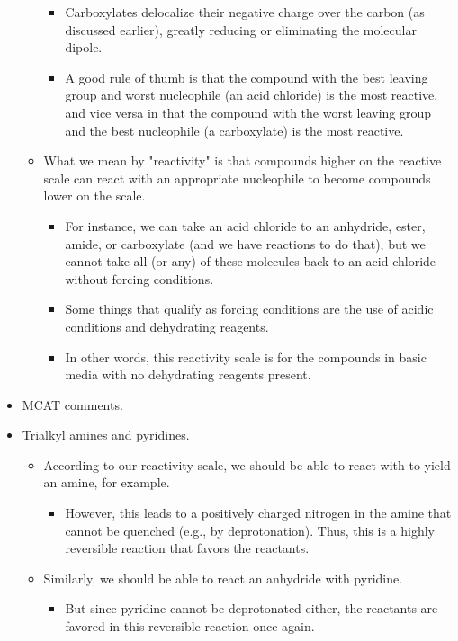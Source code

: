 \documentclass[../notes.tex]{subfiles}
\begin{document}
\begin{itemize}
\begin{itemize}
\begin{itemize}
            \item Carboxylates delocalize their negative charge over the carbon (as discussed earlier), greatly reducing or eliminating the molecular dipole.
            \item A good rule of thumb is that the compound with the best leaving group and worst nucleophile (an acid chloride) is the most reactive, and vice versa in that the compound with the worst leaving group and the best nucleophile (a carboxylate) is the most reactive.
        \end{itemize}
        \item What we mean by "reactivity" is that compounds higher on the reactive scale can react with an appropriate nucleophile to become compounds lower on the scale.
        \begin{itemize}
            \item For instance, we can take an acid chloride to an anhydride, ester, amide, or carboxylate (and we have reactions to do that), but we cannot take all (or any) of these molecules back to an acid chloride without forcing conditions.
            \item Some things that qualify as forcing conditions are the use of acidic conditions and dehydrating reagents.
            \item In other words, this reactivity scale is for the compounds in basic media with no dehydrating reagents present.
        \end{itemize}
    \end{itemize}
    \item MCAT comments.
    \item Trialkyl amines and pyridines.
    \begin{itemize}
        \item According to our reactivity scale, we should be able to react  with  to yield an amine, for example.
        \begin{itemize}
            \item However, this leads to a positively charged nitrogen in the amine that cannot be quenched (e.g., by deprotonation). Thus, this is a highly reversible reaction that favors the reactants.
        \end{itemize}
        \item Similarly, we should be able to react an anhydride with pyridine.
        \begin{itemize}
            \item But since pyridine cannot be deprotonated either, the reactants are favored in this reversible reaction once again.

\end{itemize}
\end{itemize}
\end{itemize}
\end{document}
